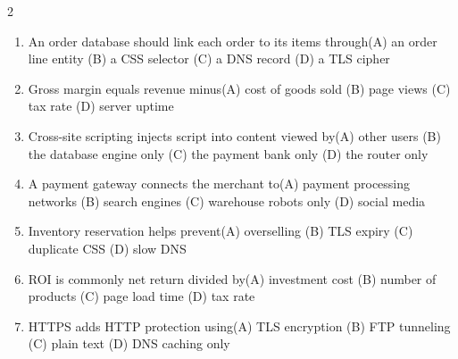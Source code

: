 \documentclass[a4paper]{article}
\begin{document}
\begin{multicols*}{2}
\begin{enumerate}[resume]
\item An order database should link each order to its items through\newline\hspace*{0.6em}(A) an order line entity \quad (B) a CSS selector \newline\hspace*{0.6em}(C) a DNS record \quad (D) a TLS cipher
\item Gross margin equals revenue minus\newline\hspace*{0.6em}(A) cost of goods sold \quad (B) page views \newline\hspace*{0.6em}(C) tax rate \quad (D) server uptime
\item Cross-site scripting injects script into content viewed by\newline\hspace*{0.6em}(A) other users \quad (B) the database engine only \newline\hspace*{0.6em}(C) the payment bank only \quad (D) the router only
\item A payment gateway connects the merchant to\newline\hspace*{0.6em}(A) payment processing networks \quad (B) search engines \newline\hspace*{0.6em}(C) warehouse robots only \quad (D) social media
\item Inventory reservation helps prevent\newline\hspace*{0.6em}(A) overselling \quad (B) TLS expiry \newline\hspace*{0.6em}(C) duplicate CSS \quad (D) slow DNS
\item ROI is commonly net return divided by\newline\hspace*{0.6em}(A) investment cost \quad (B) number of products \newline\hspace*{0.6em}(C) page load time \quad (D) tax rate
\item HTTPS adds HTTP protection using\newline\hspace*{0.6em}(A) TLS encryption \quad (B) FTP tunneling \newline\hspace*{0.6em}(C) plain text \quad (D) DNS caching only

\end{enumerate}
\end{multicols*}
\end{document}
